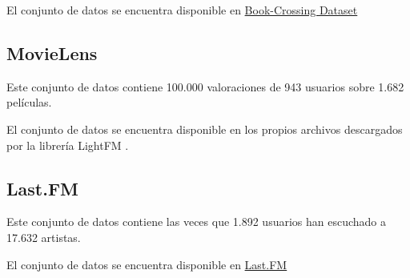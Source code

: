 El conjunto de datos se encuentra disponible en \href{http://www2.informatik.uni-freiburg.de/~cziegler/BX/BX-CSV-Dump.zip}{Book-Crossing Dataset}

\subsection{MovieLens}\label{movielens}
Este conjunto de datos \cite{GroupLens1998} contiene 100.000 valoraciones de 943 usuarios sobre 1.682 películas.

El conjunto de datos se encuentra disponible en los propios archivos descargados por la librería LightFM \cite{DBLP:conf/recsys/Kula15}.

\subsection{Last.FM}\label{last.fm}
Este conjunto de datos \cite{Cantador:RecSys2011} contiene las veces que 1.892 usuarios han escuchado a 17.632 artistas.

El conjunto de datos se encuentra disponible en \href{http://files.grouplens.org/datasets/hetrec2011/hetrec2011-lastfm-2k.zip}{Last.FM}
